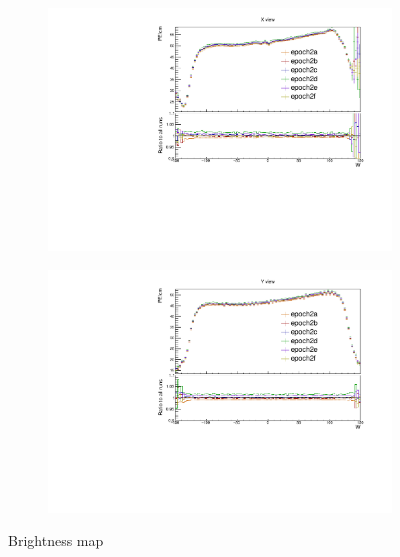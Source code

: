 \documentclass[12pt,a4paper]{article}
\begin{document}
\begin{figure}[hbtp]
\centering
\begin{subfigure}[b]{\textwidth}
\centering
\includegraphics[width=\textwidth]{Plots/Attenprofs_P2Data_WPE_corr_xy_X_Combined.pdf}
\end{subfigure}
\begin{subfigure}[b]{\textwidth}
\centering
\includegraphics[width=\textwidth]{Plots/Attenprofs_P2Data_WPE_corr_xy_Y_Combined.pdf}
\end{subfigure}
\caption{Brightness map}
\end{figure}
\end{document}
